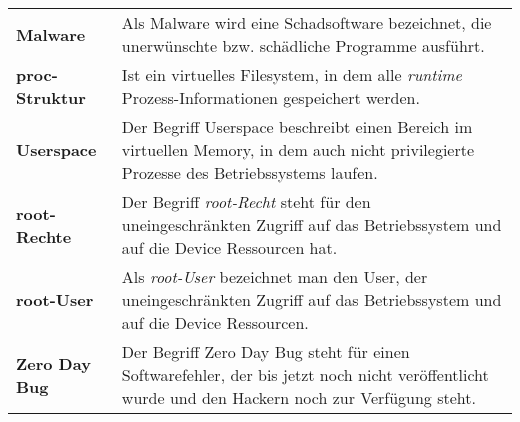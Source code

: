 \begin{table*}[htbp]
\begin{center}
\begin{tabular}{p{3cm}p{12cm}}
		  \textbf{Malware} &  Als Malware wird eine Schadsoftware bezeichnet, die unerwünschte bzw. schädliche Programme ausführt.\\
		 
		  \textbf{proc-Struktur} & Ist ein virtuelles Filesystem, in dem alle \textit{\glqq runtime\grqq{}} Prozess-Informationen gespeichert werden.\\
		  
		  \textbf{Userspace} & Der Begriff Userspace beschreibt einen Bereich im virtuellen Memory, in dem auch nicht privilegierte Prozesse des Betriebssystems laufen.\\
		  
		 \textbf{root-Rechte} &  Der Begriff \textit{\glqq root-Recht\grqq{}} steht für den uneingeschränkten Zugriff auf das Betriebssystem und auf die Device Ressourcen hat.\\
		 \textbf{root-User} &  Als \textit{\glqq root-User\grqq{}} bezeichnet man den User, der uneingeschränkten Zugriff auf das Betriebssystem und auf die Device Ressourcen.\\ 
		 \textbf{Zero Day Bug} &  Der Begriff Zero Day Bug steht für einen Softwarefehler, der bis jetzt noch nicht veröffentlicht wurde und den Hackern noch zur Verfügung steht.\\
		  
		\end{tabular}		    
    \end{center}
\end{table*}